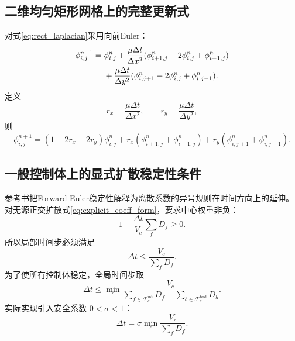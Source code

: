 \documentclass[UTF8,12pt,a4paper]{ctexart}
\numberwithin{equation}{section}
\begin{document}
\subsection{二维均匀矩形网格上的完整更新式}

对式\eqref{eq:rect_laplacian}采用向前Euler：
\begin{align}
  \phi_{i,j}^{n+1}
  ={}&\phi_{i,j}^n
  +\frac{\mu\Delta t}{\Delta x^2}
  (\phi_{i+1,j}^n-2\phi_{i,j}^n+\phi_{i-1,j}^n)
  \notag\\
  &+\frac{\mu\Delta t}{\Delta y^2}
  (\phi_{i,j+1}^n-2\phi_{i,j}^n+\phi_{i,j-1}^n).
  \label{eq:2d_explicit}
\end{align}
定义
\begin{equation}
  r_x=\frac{\mu\Delta t}{\Delta x^2},
  \qquad
  r_y=\frac{\mu\Delta t}{\Delta y^2},
  \label{eq:rx_ry}
\end{equation}
则
\begin{equation}
  \boxed{
  \phi_{i,j}^{n+1}
  =(1-2r_x-2r_y)\phi_{i,j}^n
  +r_x(\phi_{i+1,j}^n+\phi_{i-1,j}^n)
  +r_y(\phi_{i,j+1}^n+\phi_{i,j-1}^n)}.
  \label{eq:2d_explicit_weights}
\end{equation}

\subsection{一般控制体上的显式扩散稳定性条件}

参考书把Forward Euler稳定性解释为离散系数的异号规则在时间方向上的延伸。对无源正交扩散式\eqref{eq:explicit_coeff_form}，要求中心权重非负：
\begin{equation}
  1-\frac{\Delta t}{V_c}\sum_fD_f\geq0.
  \label{eq:positive_center_weight}
\end{equation}
所以局部时间步必须满足
\begin{equation}
  \Delta t\leq\frac{V_c}{\sum_fD_f}.
  \label{eq:local_dt_bound}
\end{equation}
为了使所有控制体稳定，全局时间步取
\begin{equation}
  \boxed{
  \Delta t
  \leq
  \min_c
  \frac{V_c}{
  \displaystyle\sum_{f\in\mathcal F_c^{\mathrm{int}}}D_f
  +\displaystyle\sum_{b\in\mathcal F_c^{\mathrm{bnd}}}D_b}}.
  \label{eq:global_dt_bound}
\end{equation}
实际实现引入安全系数 $0<\sigma<1$：
\begin{equation}
  \boxed{
  \Delta t
  =\sigma
  \min_c
  \frac{V_c}{\sum_fD_f}}.
  \label{eq:safe_dt}
\end{equation}
\end{document}
